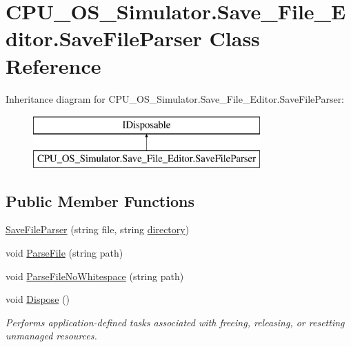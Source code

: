 \hypertarget{class_c_p_u___o_s___simulator_1_1_save___file___editor_1_1_save_file_parser}{}\section{C\+P\+U\+\_\+\+O\+S\+\_\+\+Simulator.\+Save\+\_\+\+File\+\_\+\+Editor.\+Save\+File\+Parser Class Reference}
\label{class_c_p_u___o_s___simulator_1_1_save___file___editor_1_1_save_file_parser}
Inheritance diagram for C\+P\+U\+\_\+\+O\+S\+\_\+\+Simulator.\+Save\+\_\+\+File\+\_\+\+Editor.\+Save\+File\+Parser\+:\begin{figure}[H]
\begin{center}
\leavevmode
\includegraphics[height=2.000000cm]{class_c_p_u___o_s___simulator_1_1_save___file___editor_1_1_save_file_parser}
\end{center}
\end{figure}
\subsection*{Public Member Functions}
\begin{DoxyCompactItemize}
\item 
\hyperlink{class_c_p_u___o_s___simulator_1_1_save___file___editor_1_1_save_file_parser_aba2cd09981d18cb3f274dd2cb3e7506e}{Save\+File\+Parser} (string file, string \hyperlink{class_c_p_u___o_s___simulator_1_1_save___file___editor_1_1_save_file_parser_a4da217cd7a49f8a0b3ad09db5b609ab6}{directory})
\item 
void \hyperlink{class_c_p_u___o_s___simulator_1_1_save___file___editor_1_1_save_file_parser_a2c4737d091b4be2e7ea7cd5c13dd500a}{Parse\+File} (string path)
\item 
void \hyperlink{class_c_p_u___o_s___simulator_1_1_save___file___editor_1_1_save_file_parser_a99fbbf56a2c81b54ca06529a0a981b17}{Parse\+File\+No\+Whitespace} (string path)
\item 
void \hyperlink{class_c_p_u___o_s___simulator_1_1_save___file___editor_1_1_save_file_parser_ac67b2c4ef9433395b274e8b9cc632143}{Dispose} ()
\begin{DoxyCompactList}\small\item\em Performs application-\/defined tasks associated with freeing, releasing, or resetting unmanaged resources. \end{DoxyCompactList}\end{DoxyCompactItemize}
